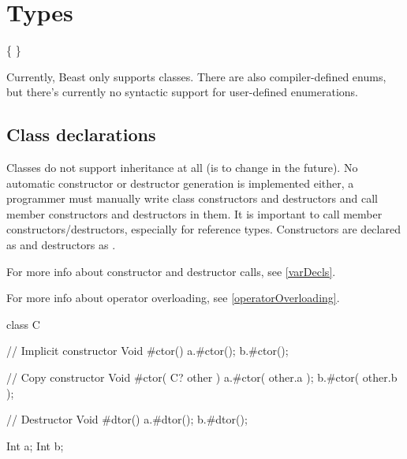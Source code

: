 \chapter{Types}

\begin{grammar}
	 \{  \}   \kwd{\{}  \kwd{\}}
\end{grammar}

Currently, Beast only supports classes. There are also compiler-defined enums, but there's currently no syntactic support for user-defined enumerations.

\section{Class declarations}
Classes do not support inheritance at all (is to change in the future). No automatic constructor or destructor generation is implemented either, a programmer must manually write class constructors and destructors and call member constructors and destructors in them. It is important to call member constructors/destructors, especially for reference types. Constructors are declared as  and destructors as .

For more info about constructor and destructor calls, see \autoref{varDecls}.

For more info about operator overloading, see \autoref{operatorOverloading}.

\begin{code}
class C {

	// Implicit constructor
	Void #ctor() {
		a.#ctor();
		b.#ctor();
	}
	
	// Copy constructor
	Void #ctor( C? other ) {
		a.#ctor( other.a );
		b.#ctor( other.b );	
	}

	// Destructor
	Void #dtor() {
		a.#dtor();
		b.#dtor();	
	}

	Int a;
	Int b;

}
\end{code}

